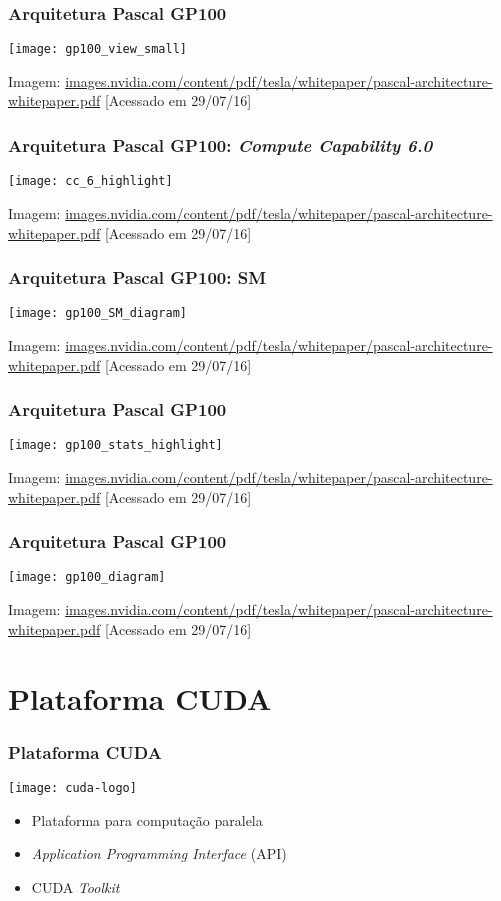 \documentclass[10pt, compress, aspectratio=43, xcolor={table,usenames,dvipsnames}]{beamer}
\begin{document}
\begin{frame}
    \frametitle{Arquitetura Pascal GP100}
    \centering
    \texttt{[image: gp100\_view\_small]}
    \vfill

    \tiny{Imagem: \url{images.nvidia.com/content/pdf/tesla/whitepaper/pascal-architecture-whitepaper.pdf} [Acessado em 29/07/16]}
\end{frame}

\begin{frame}
    \frametitle{Arquitetura Pascal GP100: \textit{Compute Capability 6.0}}
    \centering
    \texttt{[image: cc\_6\_highlight]}
    \vfill

    \tiny{Imagem: \url{images.nvidia.com/content/pdf/tesla/whitepaper/pascal-architecture-whitepaper.pdf} [Acessado em 29/07/16]}
\end{frame}

\begin{frame}
    \frametitle{Arquitetura Pascal GP100: SM}
    \centering
    \texttt{[image: gp100\_SM\_diagram]}
    \vfill

    \tiny{Imagem: \url{images.nvidia.com/content/pdf/tesla/whitepaper/pascal-architecture-whitepaper.pdf} [Acessado em 29/07/16]}
\end{frame}

\begin{frame}
    \frametitle{Arquitetura Pascal GP100}
    \centering
    \texttt{[image: gp100\_stats\_highlight]}
    \vfill

    \tiny{Imagem: \url{images.nvidia.com/content/pdf/tesla/whitepaper/pascal-architecture-whitepaper.pdf} [Acessado em 29/07/16]}
\end{frame}

\begin{frame}
    \frametitle{Arquitetura Pascal GP100}
    \centering
    \texttt{[image: gp100\_diagram]}
    \vfill

    \tiny{Imagem: \url{images.nvidia.com/content/pdf/tesla/whitepaper/pascal-architecture-whitepaper.pdf} [Acessado em 29/07/16]}
\end{frame}

\section{Plataforma CUDA}

\begin{frame}
    \frametitle{Plataforma CUDA}
    \begin{center}
        \texttt{[image: cuda-logo]}
    \end{center}

    \begin{itemize}
        \item Plataforma para \alert{computação paralela}
        \item \textit{Application Programming Interface} (API)
        \item CUDA \textit{Toolkit}
    \end{itemize}
\end{frame}
\end{document}

